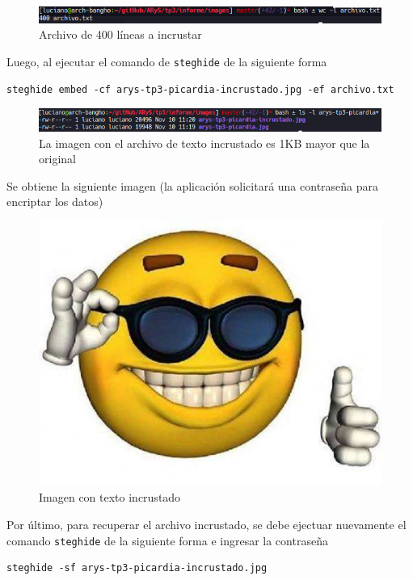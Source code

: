 \begin{figure}[H]
    \centering
    \includegraphics[width=\linewidth]{images/arys-tp3-esteganografia-archivo.png}
    \caption*{Archivo de 400 líneas a incrustar}
\end{figure}

Luego, al ejecutar el comando de \texttt{steghide} de la siguiente forma 

\begin{lstlisting}
steghide embed -cf arys-tp3-picardia-incrustado.jpg -ef archivo.txt 
\end{lstlisting}

\begin{figure}[H]
    \centering
    \includegraphics[width=\linewidth]{images/arys-tp3-esteganografia.png}
    \caption*{La imagen con el archivo de texto incrustado es 1KB mayor que la original}
\end{figure}

Se obtiene la siguiente imagen (la aplicación solicitará una contraseña para encriptar los datos)

\begin{figure}[H]
    \centering
    \includegraphics[scale=0.5]{images/arys-tp3-picardia-incrustado.jpg}
    \caption*{Imagen con texto incrustado}
\end{figure}

Por último, para recuperar el archivo incrustado, se debe ejectuar nuevamente el comando \texttt{steghide} de la siguiente forma e ingresar la contraseña

\begin{lstlisting}
steghide -sf arys-tp3-picardia-incrustado.jpg
\end{lstlisting}



\clearpage
\printbibliography


